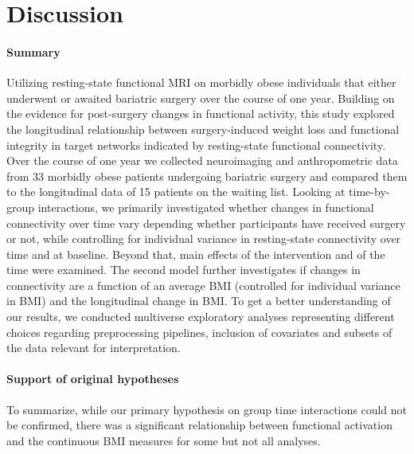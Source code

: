 \documentclass[
]{article}
\begin{document}
\hypertarget{discussion}{%
\section{Discussion}\label{discussion}}

\hypertarget{summary}{%
\paragraph{Summary}\label{summary}}

Utilizing resting-state functional MRI on morbidly obese individuals that either underwent or awaited bariatric surgery over the course of one year.
Building on the evidence for post-surgery changes in functional activity, this study explored the longitudinal relationship between surgery-induced weight loss and functional integrity in target networks indicated by resting-state functional connectivity. Over the course of one year we collected neuroimaging and anthropometric data from 33 morbidly obese patients undergoing bariatric surgery and compared them to the longitudinal data of 15 patients on the waiting list.
Looking at time-by-group interactions, we primarily investigated whether changes in functional connectivity over time vary depending whether participants have received surgery or not, while controlling for individual variance in resting-state connectivity over time and at baseline. Beyond that, main effects of the intervention and of the time were examined.
The second model further investigates if changes in connectivity are a function of an average BMI (controlled for individual variance in BMI) and the longitudinal change in BMI.
To get a better understanding of our results, we conducted multiverse exploratory analyses representing different choices regarding preprocessing pipelines, inclusion of covariates and subsets of the data relevant for interpretation.

\hypertarget{support-of-original-hypotheses}{%
\paragraph{Support of original hypotheses}\label{support-of-original-hypotheses}}

To summarize, while our primary hypothesis on group time interactions could not be confirmed, there was a significant relationship between functional activation
and the continuous BMI measures for some but not all analyses.
\end{document}
